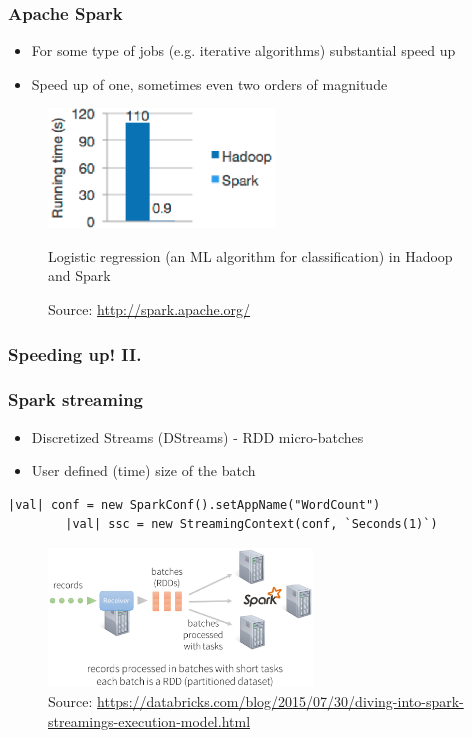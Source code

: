 \documentclass[10pt,utf8]{beamer}
\begin{document}
\begin{frame}
	\frametitle{Apache Spark}
		\begin{itemize}
			\item For some type of jobs (e.g. iterative algorithms) substantial speed up
			\item Speed up of one, sometimes even two orders of magnitude
		\end{itemize}
	  \begin{figure}
			\centering
			\includegraphics[width=6cm]{./img/hadoop_vs_spark.eps}
			\caption{\tiny{Logistic regression (an ML algorithm for classification) in Hadoop and Spark}}
			\vspace{-0.7cm}
			\caption{\tiny{Source: \url{http://spark.apache.org/}}}
		\end{figure}
\end{frame}

\begin{frame}
	\frametitle{Speeding up! II.}
	 {
		\vspace{0.5cm}
		\vspace{0.5cm}
	}
\end{frame}

\begin{frame}[fragile]
	\frametitle{Spark streaming}
	\begin{itemize}
	 \item Discretized Streams (DStreams) - RDD micro-batches
	 \item User defined (time) size of the batch
	\end{itemize}

	\begin{lstlisting}[style=Java]
		|val| conf = new SparkConf().setAppName("WordCount")
		|val| ssc = new StreamingContext(conf, `Seconds(1)`)
	\end{lstlisting}
	
	\begin{figure}
		\centering
		\includegraphics[width=7cm]{./img/spark-streaming2.eps}
		\caption{\tiny{Source: \url{https://databricks.com/blog/2015/07/30/diving-into-spark-streamings-execution-model.html}}}
	\end{figure}
\end{frame}
\end{document}
